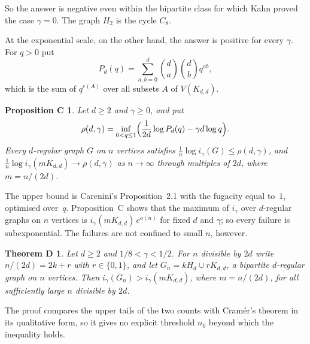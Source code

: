 \documentclass[11pt]{article}
\newtheorem*{propC}{Proposition C}
\newtheorem*{thmD}{Theorem D}
\theoremstyle{remark}
\begin{document}
So the answer is negative even within the bipartite class for which Kahn
proved the case $\gamma=0$. The graph $H_2$ is the cycle $C_8$.

At the exponential scale, on the other hand, the answer is positive for every
$\gamma$. For $q>0$ put
\[
 P_d(q)=\sum_{a,b=0}^d\binom da\binom db q^{ab},
\]
which is the sum of $q^{e(A)}$ over all subsets $A$ of $V(K_{d,d})$.

\begin{propC}
Let $d\ge2$ and $\gamma\ge0$, and put
\[
 \rho(d,\gamma)=\inf_{0<q\le1}\Bigl(\frac1{2d}\log P_d(q)-\gamma d\log q\Bigr).
\]
Every $d$-regular graph $G$ on $n$ vertices satisfies
$\frac1n\log i_\gamma(G)\le\rho(d,\gamma)$, and
$\frac1n\log i_\gamma(mK_{d,d})\to\rho(d,\gamma)$ as $n\to\infty$ through
multiples of $2d$, where $m=n/(2d)$.
\end{propC}

The upper bound is Carenini's Proposition~2.1 with the fugacity equal to~$1$,
optimised over~$q$. Proposition~C shows that the maximum of $i_\gamma$ over
$d$-regular graphs on $n$ vertices is $i_\gamma(mK_{d,d})\,e^{o(n)}$ for fixed
$d$ and $\gamma$; so every failure is subexponential. The failures are not
confined to small $n$, however.

\begin{thmD}
Let $d\ge2$ and $1/8<\gamma<1/2$. For $n$ divisible by $2d$ write
$n/(2d)=2k+r$ with $r\in\{0,1\}$, and let $G_n=kH_d\cup rK_{d,d}$, a bipartite
$d$-regular graph on $n$ vertices. Then $i_\gamma(G_n)>i_\gamma(mK_{d,d})$,
where $m=n/(2d)$, for all sufficiently large $n$ divisible by $2d$.
\end{thmD}

The proof compares the upper tails of the two counts with Cramér's theorem in
its qualitative form, so it gives no explicit threshold $n_0$ beyond which the
inequality holds.
\end{document}
